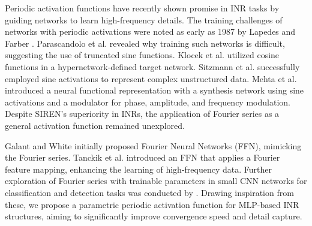 Periodic activation functions have recently shown promise in INR tasks by guiding networks to learn high-frequency details. The training challenges of networks with periodic activations were noted as early as 1987 by Lapedes and Farber \citep{lapedes1987nonlinear}. Parascandolo et al. \citep{parascandolo2016taming} revealed why training such networks is difficult, suggesting the use of truncated sine functions. Klocek et al. \citep{klocek2019hypernetwork} utilized cosine functions in a hypernetwork-defined target network. Sitzmann et al. \citep{Siren} successfully employed sine activations to represent complex unstructured data. Mehta et al. \citep{mehta2021modulated} introduced a neural functional representation with a synthesis network using sine activations and a modulator for phase, amplitude, and frequency modulation. Despite SIREN's superiority in INRs, the application of Fourier series as a general activation function remained unexplored.

Galant and White \citep{gallant1988there} initially proposed Fourier Neural Networks (FFN), mimicking the Fourier series. Tanckik et al. \citep{tancik2020fourier} introduced an FFN that applies a Fourier feature mapping, enhancing the learning of high-frequency data. Further exploration of Fourier series with trainable parameters in small CNN networks for classification and detection tasks was conducted by \citep{shivappriya2021cascade, liao2020trainable}. Drawing inspiration from these, we propose a parametric periodic activation function for MLP-based INR structures, aiming to significantly improve convergence speed and detail capture.
\fi
